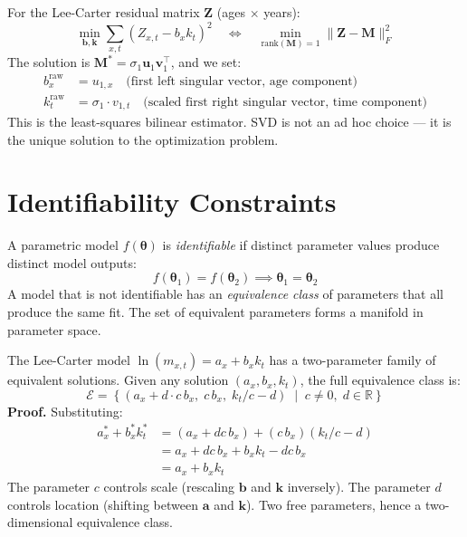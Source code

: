 \documentclass[11pt,a4paper]{article}
\begin{document}
\begin{application}
For the Lee-Carter residual matrix $\bm{Z}$ (ages $\times$ years):
\[
\min_{\bm{b}, \bm{k}} \sum_{x,t} \left(Z_{x,t} - b_x k_t\right)^2 \quad \Longleftrightarrow \quad \min_{\mathrm{rank}(\bm{M})=1} \|\bm{Z} - \bm{M}\|_F^2
\]
The solution is $\bm{M}^* = \sigma_1 \bm{u}_1 \bm{v}_1^\top$, and we set:
\begin{align*}
b_x^{\text{raw}} &= u_{1,x} \quad \text{(first left singular vector, age component)} \\
k_t^{\text{raw}} &= \sigma_1 \cdot v_{1,t} \quad \text{(scaled first right singular vector, time component)}
\end{align*}
This is the least-squares bilinear estimator. SVD is not an ad hoc choice ---
it is the unique solution to the optimization problem.
\end{application}

\section{Identifiability Constraints}

\begin{formaldef}
A parametric model $f(\bm{\theta})$ is \emph{identifiable} if distinct parameter values produce
distinct model outputs:
\[
f(\bm{\theta}_1) = f(\bm{\theta}_2) \implies \bm{\theta}_1 = \bm{\theta}_2
\]
A model that is not identifiable has an \emph{equivalence class} of parameters that all
produce the same fit. The set of equivalent parameters forms a manifold in parameter space.
\end{formaldef}

\begin{formaldef}
The Lee-Carter model $\ln(m_{x,t}) = a_x + b_x k_t$ has a two-parameter family of equivalent
solutions. Given any solution $(a_x, b_x, k_t)$, the full equivalence class is:
\[
\mathcal{E} = \left\{ (a_x + d \cdot c \, b_x, \; c \, b_x, \; k_t/c - d) \;\middle|\; c \neq 0, \; d \in \mathbb{R} \right\}
\]
\textbf{Proof.} Substituting:
\begin{align*}
a_x^* + b_x^* k_t^* &= (a_x + dc\,b_x) + (c\,b_x)(k_t/c - d) \\
&= a_x + dc\,b_x + b_x k_t - dc\,b_x \\
&= a_x + b_x k_t
\end{align*}
The parameter $c$ controls scale (rescaling $\bm{b}$ and $\bm{k}$ inversely).
The parameter $d$ controls location (shifting between $\bm{a}$ and $\bm{k}$).
Two free parameters, hence a two-dimensional equivalence class.
\end{formaldef}
\end{document}
